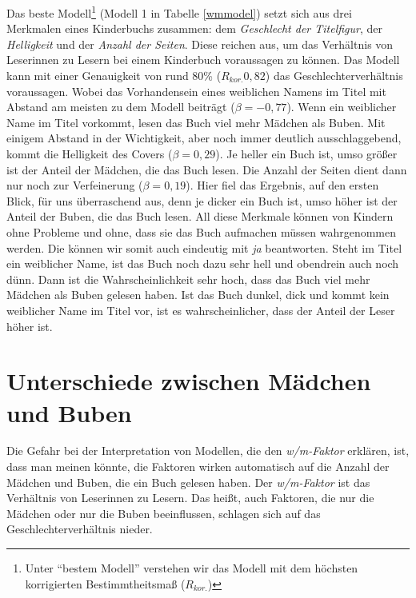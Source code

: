 Das beste
Modell\footnote{Unter \enquote{bestem Modell} verstehen wir das Modell mit dem höchsten korrigierten Bestimmtheitsmaß (\(R_{kor.}\))}
(Modell 1 in Tabelle \ref{wmmodel}) setzt sich aus drei Merkmalen eines
Kinderbuchs zusammen: dem \emph{Geschlecht der Titelfigur}, der
\emph{Helligkeit} und der \emph{Anzahl der Seiten}. Diese reichen aus,
um das Verhältnis von Leserinnen zu Lesern bei einem Kinderbuch
voraussagen zu können. Das Modell kann mit einer Genauigkeit von rund
80\% ($R_{kor.}0{,}82$) das Geschlechterverhältnis voraussagen. Wobei
das Vorhandensein eines weiblichen Namens im Titel mit Abstand am
meisten zu dem Modell beiträgt ($\beta=-0{,}77$). Wenn ein weiblicher
Name im Titel vorkommt, lesen das Buch viel mehr Mädchen als Buben. Mit
einigem Abstand in der Wichtigkeit, aber noch immer deutlich
ausschlaggebend, kommt die Helligkeit des Covers ($\beta=0{,}29$). Je
heller ein Buch ist, umso größer ist der Anteil der Mädchen, die das
Buch lesen. Die Anzahl der Seiten dient dann nur noch zur Verfeinerung
($\beta=0{,}19$). Hier fiel das Ergebnis, auf den ersten Blick, für uns
überraschend aus, denn je dicker ein Buch ist, umso höher ist der Anteil
der Buben, die das Buch lesen. All diese Merkmale können von Kindern
ohne Probleme und ohne, dass sie das Buch aufmachen müssen wahrgenommen
werden. Die  können wir somit auch 
eindeutig mit \emph{ja} beantworten. Steht im Titel ein weiblicher Name,
ist das Buch noch dazu sehr hell und obendrein auch noch dünn. Dann ist
die Wahrscheinlichkeit sehr hoch, dass das Buch viel mehr Mädchen als
Buben gelesen haben. Ist das Buch dunkel, dick und kommt kein weiblicher
Name im Titel vor, ist es wahrscheinlicher, dass der Anteil der Leser
höher ist.







\section{Unterschiede zwischen Mädchen und Buben}

Die Gefahr bei der Interpretation von Modellen, die den
\emph{w/m-Faktor} erklären, ist, dass man meinen könnte, die Faktoren
wirken automatisch auf die Anzahl der Mädchen und Buben, die ein Buch
gelesen haben. Der \emph{w/m-Faktor} ist das Verhältnis von Leserinnen
zu Lesern. Das heißt, auch Faktoren, die nur die Mädchen oder nur die
Buben beeinflussen, schlagen sich auf das Geschlechterverhältnis nieder.


